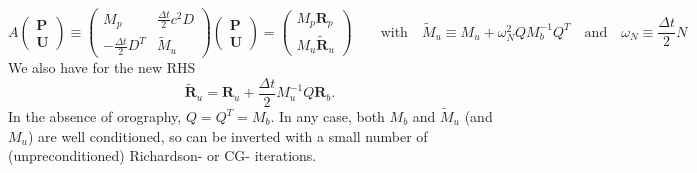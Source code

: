 \documentclass[10pt]{article}
\renewcommand{\vec}[1]{\boldsymbol{#1}}
\begin{document}
\begin{equation}
  A\begin{pmatrix}\vec{P}\\[1ex]\vec{U}\end{pmatrix}
  \equiv
  \begin{pmatrix}
   M_p & \frac{\Delta t}{2}c^2 D \\[1ex]
   -\frac{\Delta t}{2}D^T & \tilde{M}_u
  \end{pmatrix}
  \begin{pmatrix}\vec{P}\\[1ex]\vec{U}\end{pmatrix}
 =
\begin{pmatrix}M_p\vec{R}_p\\[1ex]M_u\tilde{\vec{R}}_u\end{pmatrix}
\qquad\text{with}\quad 
\tilde{M}_u \equiv M_u + \omega^2_N QM_b^{-1}Q^T
\quad\text{and}\quad \omega_N \equiv \frac{\Delta t}{2}N\label{eqn:PressureVelocitySystem}
\end{equation}
We also have for the new RHS
\begin{equation}
  \tilde{\vec{R}}_u = \vec{R}_u+\frac{\Delta t}{2}M_u^{-1}Q\vec{R}_b.
  \label{eqn:BuoyancyRHS}
\end{equation}
In the absence of orography, $Q=Q^T=M_b$. In any case, both $M_b$ and $\tilde{M}_u$ (and $M_u$) are well conditioned, so can be inverted with a small number of (unpreconditioned) Richardson- or CG- iterations.
\end{document}
